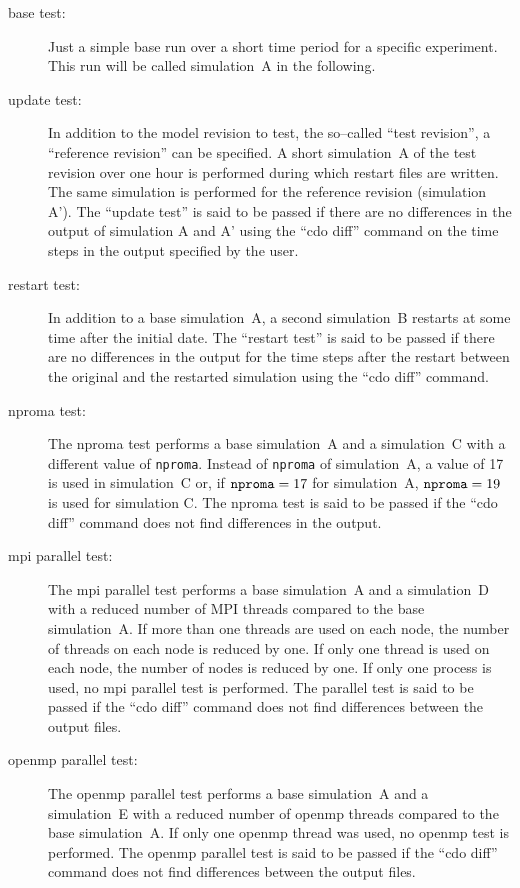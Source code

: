 \begin{description}
\item[{base test:}] Just a simple base run over a short time period
  for a specific experiment. This run will be called
  simulation~A in the following.
\item[{update test:}] In addition to the model revision to test,
  the so--called ``test
  revision'', a ``reference revision'' can be specified. A short
  simulation~A of the test revision over one hour is 
  performed during which restart files are written. The same
  simulation is performed for the reference revision (simulation
  A'). The ``update 
  test'' is said to be passed if there are no differences in the
  output of simulation A and A' using the ``cdo diff'' command on the
  time steps in the output specified by the user.
\item[{restart test:}] In addition to a base simulation~A, a second
  simulation~B restarts \icon{} at some time after the initial date. 
  The ``restart test'' is
  said to be passed if there are no differences in the output for the
  time steps after the restart between the original and the restarted
  simulation using the ``cdo diff'' command. 
\item[{nproma test:}] The nproma test performs a base simulation~A
  and a
  simulation~C with a different value
  of {\tt nproma}. Instead of {\tt nproma} of simulation~A, a value
  of 17 is used 
  in simulation~C or, if ${\tt nproma}=17$ for simulation~A, ${\tt
    nproma}=19$ is used for simulation C. The nproma test is
  said to be passed if the ``cdo diff'' command does not find
  differences in the output.
\item[{mpi parallel test:}] 
  The mpi parallel test performs a base simulation~A and a simulation~D 
  with a reduced number of
  MPI threads compared to the base simulation~A. If more
  than one threads are used on each node, the number of threads on
  each node is reduced by one. If only one thread is used on each
  node, the number of nodes is reduced by one. If only one process is
  used, no mpi parallel test is performed. The parallel test is said
  to be passed if the ``cdo diff'' 
  command does not find differences between the output files.
\item[{openmp parallel test:}]
  The openmp parallel test performs a base simulation~A and a
  simulation~E with a reduced number of
  openmp threads compared to the base simulation~A.
  If only one openmp thread was used, no openmp test is performed.
  The openmp parallel test is said to be passed if the
  ``cdo diff'' 
  command does not find differences between the output files.
\end{description}

